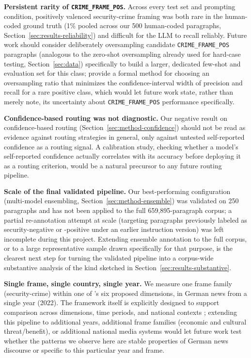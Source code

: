 \documentclass[a4paper,oneside,bibliography=totoc]{scrartcl}
\begin{document}
\textbf{Persistent rarity of \texttt{CRIME\_FRAME\_POS}.} Across every test set and prompting condition, positively valenced security-crime framing was both rare in the human-coded ground truth (1\% pooled across our 500 human-coded paragraphs, Section~\ref{sec:results-reliability}) and difficult for the LLM to recall reliably. Future work should consider deliberately oversampling candidate \texttt{CRIME\_FRAME\_POS} paragraphs (analogous to the zero-shot oversampling already used for hard-case testing, Section~\ref{sec:data}) specifically to build a larger, dedicated few-shot and evaluation set for this class; \citet{shang2023} provide a formal method for choosing an oversampling ratio that minimizes the confidence-interval width of precision and recall for a rare positive class, which would let future work state, rather than merely note, its uncertainty about \texttt{CRIME\_FRAME\_POS} performance specifically.

\textbf{Confidence-based routing was not diagnostic.} Our negative result on confidence-based routing (Section~\ref{sec:method-confidence}) should not be read as evidence against routing strategies in general, only against untested self-reported confidence as a routing signal. A calibration study, checking whether a model's self-reported confidence actually correlates with its accuracy before deploying it as a routing criterion, would be a natural precursor to any future routing pipeline.

\textbf{Scale of the final validated pipeline.} Our best-performing configuration (multi-model ensembling, Section~\ref{sec:method-ensemble}) was validated on 250 paragraphs and has not been applied to the full 659{,}895-paragraph corpus; a partial re-annotation attempt at scale (targeting paragraphs previously labeled as security-negative or -positive under an earlier instruction version) was left incomplete during this project. Extending ensemble annotation to the full corpus, or to a large representative sample drawn specifically for that purpose, is the clearest next step for turning the validated pipeline into a corpus-wide substantive analysis of the kind sketched in Section~\ref{sec:results-substantive}.

\textbf{Single frame, single country, single year.} We measure one frame family (security-crime) within one of \citeauthor{freudenthaler2025}'s six proposed dimensions, in German news from a single year (2022). The framework itself is explicitly designed to support comparison across dimensions, time periods, and national contexts \citep{freudenthaler2025}; extending this pipeline to additional years, additional frame families (economic and cultural threat/benefit), or additional national media systems would let future work test whether the patterns we observe here are stable properties of German news discourse or specific to this particular year and frame.
\end{document}
